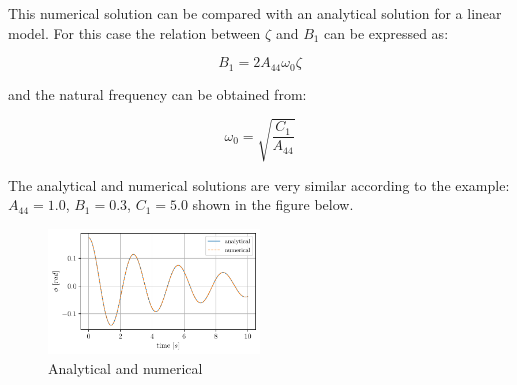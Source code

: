     

    This numerical solution can be compared with an analytical solution for
a linear model.  For this case the relation between $\zeta$ and $B_1$ can
be expressed as:
 
            
    
    \begin{equation}
B_{1} = 2 A_{44} \omega_{0} \zeta
\label{eq:equation}
\end{equation}

    

    and the natural frequency can be obtained from:
 
            
    
    \begin{equation}
\omega_{0} = \sqrt{\frac{C_{1}}{A_{44}}}
\label{eq:equation}
\end{equation}

    

    The analytical and numerical solutions are very similar according to the
example: $A_{44} = 1.0$, $B_1 = 0.3$, $C_1 = 5.0$ shown in the
figure below.

    \begin{figure}[H]
        \begin{center}\includegraphics[width = 0.5\textwidth]{figures/analytical_numerical.pdf}\end{center}
        \vspace{-1cm}
        \caption{Analytical and numerical}
        \label{fig:analytical_numerical}
    \end{figure}
    
    